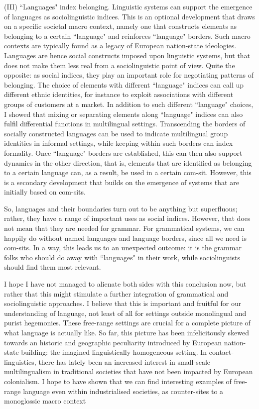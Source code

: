 (III) “Languages" index belonging. Linguistic systems can support the emergence of languages as sociolinguistic indices. This is an optional development that draws on a specific societal macro context, namely one that constructs elements as belonging to a certain “language" and reinforces “language" borders. Such macro contexts are typically found as a legacy of European nation-state ideologies. Languages are hence social constructs imposed upon linguistic systems, but that does not make them less real from a sociolinguistic point of view. Quite the opposite: as social indices, they play an important role for negotiating patterns of belonging. The choice of elements with different “language" indices can call up different ethnic identities, for instance to exploit associations with different groups of customers at a market. In addition to such different “language" choices, I showed that mixing or separating elements along “language" indices can also fulfil differential functions in multilingual settings. Transcending the borders of socially constructed languages can be used to indicate multilingual group identities in informal settings, while keeping within such borders can index formality. Once “language" borders are established, this can then also support dynamics in the other direction, that is, elements that are identified as belonging to a certain language can, as a result, be used in a certain com-sit. However, this is a secondary development that builds on the emergence of systems that are initially based on com-sits.

So, languages and their boundaries turn out to be anything but superfluous; rather, they have a range of important uses as social indices. However, that does not mean that they are needed for grammar. For grammatical systems, we can happily do without named languages and language borders, since all we need is com-sits. In a way, this leads us to an unexpected outcome: it is the grammar folks who should do away with “languages" in their work, while sociolinguists should find them most relevant.

I hope I have not managed to alienate both sides with this conclusion now, but rather that this might stimulate a further integration of grammatical and sociolinguistic approaches. I believe that this is important and fruitful for our understanding of language, not least of all for settings outside monolingual and purist hegemonies. These free-range settings are crucial for a complete picture of what language is actually like. So far, this picture has been infelicitously skewed towards an historic and geographic peculiarity introduced by European nation-state building: the imagined linguistically homogeneous setting. In contact-lin\-guis\-tics, there has lately been an increased interest in small-scale multilingualism in traditional societies that have not been impacted by European colonialism. I hope to have shown that we can find interesting examples of free-range language even within industrialised societies, as counter-sites to a monoglossic macro context


